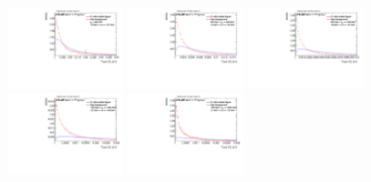 \begin{figure}
\includegraphics[width=0.3\textwidth]{sascha_input/Appendix/Distributions/higgs/distributions/beta3/h_normal_tj_C2_3_bin1.pdf} \hspace{1mm}
\includegraphics[width=0.3\textwidth]{sascha_input/Appendix/Distributions/higgs/distributions/beta3/h_normal_tj_C2_3_bin2.pdf} \hspace{4mm}
\includegraphics[width=0.3\textwidth]{sascha_input/Appendix/Distributions/higgs/distributions/beta3/h_normal_tj_C2_3_bin3.pdf} 
\bigskip
\includegraphics[width=0.3\textwidth]{sascha_input/Appendix/Distributions/higgs/distributions/beta3/h_normal_tj_C2_3_bin4.pdf} \hspace{4mm}
\includegraphics[width=0.3\textwidth]{sascha_input/Appendix/Distributions/higgs/distributions/beta3/h_normal_tj_C2_3_bin5.pdf} 


\end{figure}
